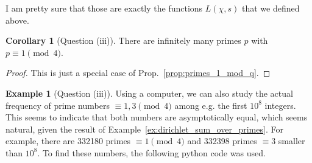 \documentclass{scrartcl}
\theoremstyle{definition}
\newtheorem{example}[definition]{Example}
\newtheorem{corollary}[definition]{Corollary}
\begin{document}
I am pretty sure that those are exactly the functions $L(\chi, s)$ that we defined above.
\begin{corollary}[Question (iii)]
    There are infinitely many primes $p$ with $p \equiv 1 \pmod 4$.
\end{corollary}
\begin{proof}
    This is just a special case of Prop.~\ref{prop:primes_1_mod_q}.
\end{proof}
\begin{example}[Question (iii)]
    Using a computer, we can also study the actual frequency of prime numbers $\equiv 1, 3 \pmod 4$ among e.g. the first $10^8$ integers.
    This seems to indicate that both numbers are asymptotically equal, which seems natural, given the result of Example~\ref{ex:dirichlet_sum_over_primes}.
    For example, there are 332180 primes $\equiv 1 \pmod 4$ and 332398 primes $\equiv 3$ smaller than $10^8$.
    To find these numbers, the following python code was used.
    
\end{example}
\end{document}
